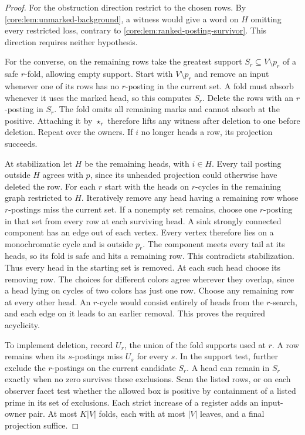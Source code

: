 \begin{proof}
For the obstruction direction restrict to the chosen rows.
By \cref{core:lem:unmarked-background}, a witness would give a word
on $H$ omitting every restricted loss, contrary to
\cref{core:lem:ranked-posting-survivor}. This direction requires
neither hypothesis.

For the converse, on the remaining rows take the greatest support
$S_r\subseteq V\setminus p_r$ of a safe $r$-fold, allowing empty
support. Start with $V\setminus p_r$ and remove an input whenever
one of its rows has no $r$-posting in the current set. A fold must
absorb whenever it uses the marked head, so this computes $S_r$.
Delete the rows with an $r$-posting in $S_r$. The fold omits all
remaining marks and cannot absorb at the positive. Attaching it by
$\star_r$ therefore lifts any witness after deletion to one before
deletion. Repeat over the owners. If $i$ no longer heads a row,
its projection succeeds.

At stabilization let $H$ be the remaining heads, with $i\in H$.
Every tail posting outside $H$ agrees with $p$, since its unheaded
projection could otherwise have deleted the row. For each $r$ start
with the heads on $r$-cycles in the remaining graph restricted to $H$.
Iteratively remove any head having a remaining row whose $r$-postings
miss the current set. If a nonempty set remains, choose one $r$-posting
in that set from every row at each surviving head. A sink strongly
connected component has an edge out of each vertex. Every vertex
therefore lies on a monochromatic cycle and is outside $p_r$.
The component meets every tail at its heads, so its fold is safe
and hits a remaining row. This contradicts stabilization. Thus every
head in the starting set is removed. At each such head choose its
removing row. The choices for different colors agree wherever they
overlap, since a head lying on cycles of two colors has just one row.
Choose any remaining row at every other head. An $r$-cycle would
consist entirely of heads from the $r$-search, and each edge on it
leads to an earlier removal. This proves the required acyclicity.

To implement deletion, record $U_r$, the union of the fold supports
used at $r$. A row remains when its $s$-postings miss $U_s$ for
every $s$. In the support test, further exclude the $r$-postings
on the current candidate $S_r$. A head can remain in $S_r$ exactly
when no zero survives these exclusions. Scan the listed rows, or
on each observer facet test whether the allowed box is positive by
containment of a listed prime in its set of exclusions. Each strict
increase of a register adds an input-owner pair. At most $K|V|$
folds, each with at most $|V|$ leaves, and a final projection suffice.
\end{proof}

